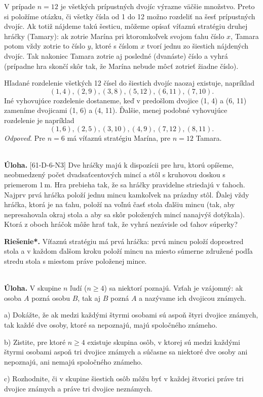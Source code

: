 \documentclass[11pt,a4paper,oneside,final]{book}
\newcommand{\ul}{\textbf{Úloha.} }
\newcommand{\rieh}{\textbf{Riešenie*.} }
\begin{document}
V prípade $n = 12$ je všetkých prípustných dvojíc výrazne väčšie množstvo. Preto si položíme otázku, či všetky čísla od 1 do 12 možno rozdeliť na šesť prípustných dvojíc. Ak totiž nájdeme takú šesticu, môžeme opísať víťaznú stratégiu druhej hráčky (Tamary): ak zotrie Marína pri ktoromkoľvek svojom ťahu číslo $x$, Tamara potom vždy zotrie to číslo $y$, ktoré s číslom $x$ tvorí jednu zo šiestich nájdených dvojíc. Tak nakoniec Tamara zotrie aj posledné (dvanáste) číslo a vyhrá (prípadne hra skončí skôr tak, že Marína nebude môcť zotrieť žiadne číslo).

Hľadané rozdelenie všetkých 12 čísel do šiestich dvojíc naozaj existuje, napríklad
$$(1, 4), (2, 9), (3, 8), (5, 12), (6, 11), (7, 10).$$
Iné vyhovujúce rozdelenie dostaneme, keď v predošlom dvojice (1, 4) a (6, 11) zameníme dvojicami (1, 6) a (4, 11). Ďalšie, menej podobné vyhovujúce rozdelenie je napríklad
$$(1, 6), (2, 5), (3, 10), (4, 9), (7, 12), (8, 11).$$
\textit{Odpoveď.} Pre $n = 6$ má víťaznú stratégiu Marína, pre $n = 12$ Tamara.\\
\\
\begin{tcolorbox}[breakable,notitle,boxrule=0pt,colback=light-gray,colframe=light-gray]\ul [61-D-6-N3] Dve hráčky majú k dispozícii pre hru, ktorú opíšeme, neobmedzený počet dvadsaťcentových mincí a stôl s kruhovou doskou s priemerom 1\,m. Hra prebieha tak, že sa hráčky pravidelne striedajú v ťahoch. Najprv prvá hráčka položí jednu mincu kamkoľvek na prázdny stôl. Ďalej vždy hráčka, ktorá je na ťahu, položí na voľnú časť stola ďalšiu mincu (tak, aby nepresahovala okraj stola a aby sa skôr položených mincí nanajvýš dotýkala). Ktorá z oboch hráčok môže hrať tak, že vyhrá nezávisle od ťahov súperky?

\end{tcolorbox}

\rieh Víťaznú stratégiu má prvá hráčka: prvú mincu položí doprostred stola a v každom ďalšom kroku položí mincu na miesto súmerne združené podľa stredu stola s miestom práve položenej mince.\\
\\
\begin{tcolorbox}[breakable,notitle,boxrule=0pt,colback=light-gray,colframe=light-gray]\ul V skupine $n$ ľudí ($n \geq 4$) sa niektorí poznajú. Vzťah  je vzájomný: ak osoba $A$ pozná osobu $B$, tak aj $B$ pozná $A$ a nazývame ich dvojicou známych.

a) Dokážte, že ak medzi každými štyrmi osobami sú aspoň štyri dvojice známych, tak každé dve osoby, ktoré sa nepoznajú, majú spoločného známeho.

b) Zistite, pre ktoré $n \geq 4$ existuje skupina osôb, v ktorej sú medzi každými štyrmi osobami aspoň tri dvojice známych a súčasne sa niektoré dve osoby ani nepoznajú, ani nemajú spoločného známeho.

c) Rozhodnite, či v skupine šiestich osôb môžu byť v každej štvorici práve tri dvojice známych a práve tri dvojice neznámych.

\end{tcolorbox}
\end{document}
